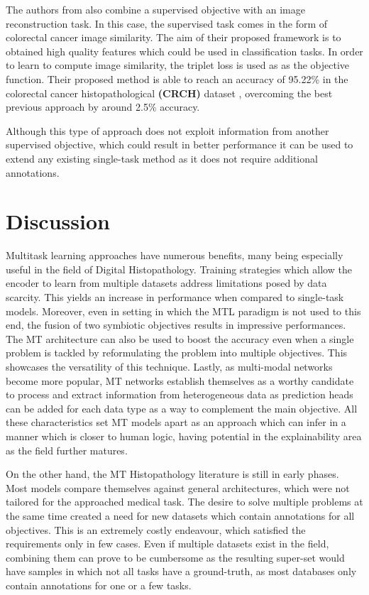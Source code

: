 \documentclass[conference]{IEEEtran}
\begin{document}
The authors from \cite{marik2022supervision} also combine a supervised objective with an image reconstruction task. In this case, the supervised task comes in the form of colorectal cancer image similarity. The aim of their proposed framework is to obtained high quality features which could be used in classification tasks. In order to learn to compute image similarity, the triplet loss \cite{dong2018triplet} is used as as the objective function. Their proposed method is able to reach an accuracy of 95.22\% in the colorectal cancer histopathological \textbf{(CRCH)} dataset \cite{kather2016multi}, overcoming the best previous approach by around 2.5\% accuracy. 

Although this type of approach does not exploit information from another supervised objective, which could result in better performance it can be used to extend any existing single-task method as it does not require additional annotations.

\section{Discussion}
\label{chapter:Discussion}

Multitask learning approaches have numerous benefits, many being especially useful in the field of Digital Histopathology. Training strategies which allow the encoder to learn from multiple datasets address limitations posed by data scarcity. This yields an increase in performance when compared to single-task models. Moreover, even in setting in which the MTL paradigm is not used to this end, the fusion of two symbiotic objectives results in impressive performances. The MT architecture can also be used to boost the accuracy even when a single problem is tackled by reformulating the problem into multiple objectives. This showcases the versatility of this technique. Lastly, as multi-modal networks become more popular, MT networks establish themselves as a worthy candidate to process and extract information from heterogeneous data as prediction heads can be added for each data type as a way to complement the main objective. All these characteristics set MT models apart as an approach which can infer in a manner which is closer to human logic, having  potential in the explainability area as the field further matures. 

On the other hand, the MT Histopathology literature is still in early phases. Most models compare themselves against general architectures, which were not tailored for the approached medical task. The desire to solve multiple problems at the same time created a need for new datasets which contain annotations for all objectives. This is an extremely costly endeavour, which satisfied the requirements only in few cases. Even if multiple datasets exist in the field, combining them can prove to be cumbersome as the resulting super-set would have samples in which not all tasks have a ground-truth, as most databases only contain annotations for one or a few tasks. 
\end{document}
